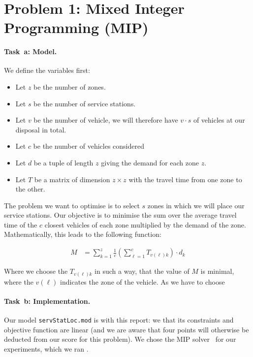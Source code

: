 \section*{Problem 1: Mixed Integer Programming (MIP)}

\newcommand{\SolverMIP}{\todo{Gurobi}\xspace}  %
\newcommand{\TimeoutMIP}{\todo{300.00}}  %

\paragraph{Task~a: Model.}
We define the variables first:
\begin{itemize}
  \item Let $z$ be the number of zones.
  \item Let $s$ be the number of service stations.
  \item Let $v$ be the number of vehicle, we will therefore have $v \cdot s$ of vehicles at our disposal in total.
  \item Let $c$ be the number of vehicles considered
  \item Let $d$ be a tuple of length $z$ giving the demand for each zone $z$.
  \item Let $T$ be a matrix of dimension $z \times z$ with the travel time from one zone to the other.
\end{itemize}
The problem we want to optimise is to select $s$ zones in which we will place our service stations. Our objective is to minimise the sum over the average travel time of the $c$ closest vehicles of each zone multiplied by the demand of the zone. Mathematically, this leads to the following function:


\begin{align*}
  M & = \sum_{k=1}^{z} \frac{1}{c}\left(\sum_{\ell = 1}^{c}  T_{v(\ell) k} \right) \cdot d_k
\end{align*}

Where we choose the $T_{v(\ell) k}$ in such a way, that the value of $M$ is minimal, where the $v(\ell)$ indicates the zone of the vehicle. As we have to choose 


\paragraph{Task~b: Implementation.}
Our model \texttt{servStatLoc.mod} is  with this
report: we  that its constraints and objective function
are linear (and we are aware that four points will otherwise be
deducted from our score for this problem).
%
We chose the MIP solver~\SolverMIP for our experiments, which we ran
.

